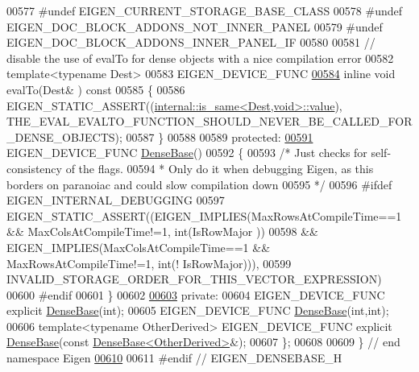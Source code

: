 \begin{DoxyCode}
00577 \textcolor{preprocessor}{#undef EIGEN\_CURRENT\_STORAGE\_BASE\_CLASS}
00578 \textcolor{preprocessor}{#undef EIGEN\_DOC\_BLOCK\_ADDONS\_NOT\_INNER\_PANEL}
00579 \textcolor{preprocessor}{#undef EIGEN\_DOC\_BLOCK\_ADDONS\_INNER\_PANEL\_IF}
00580 
00581     \textcolor{comment}{// disable the use of evalTo for dense objects with a nice compilation error}
00582     \textcolor{keyword}{template}<\textcolor{keyword}{typename} Dest>
00583     EIGEN\_DEVICE\_FUNC
\hyperlink{group___core___module_ad770bd93a55f1b4a561a00dbda6207d7}{00584}     \textcolor{keyword}{inline} \textcolor{keywordtype}{void} evalTo(Dest& )\textcolor{keyword}{ const}
00585 \textcolor{keyword}{    }\{
00586       EIGEN\_STATIC\_ASSERT((\hyperlink{struct_eigen_1_1internal_1_1is__same}{internal::is\_same<Dest,void>::value}),
      THE\_EVAL\_EVALTO\_FUNCTION\_SHOULD\_NEVER\_BE\_CALLED\_FOR\_DENSE\_OBJECTS);
00587     \}
00588 
00589   \textcolor{keyword}{protected}:
\hyperlink{group___core___module_ae966dfaa11cfd07e87da040b7a9d8216}{00591}     EIGEN\_DEVICE\_FUNC \hyperlink{group___core___module_ae966dfaa11cfd07e87da040b7a9d8216}{DenseBase}()
00592     \{
00593       \textcolor{comment}{/* Just checks for self-consistency of the flags.}
00594 \textcolor{comment}{       * Only do it when debugging Eigen, as this borders on paranoiac and could slow compilation down}
00595 \textcolor{comment}{       */}
00596 \textcolor{preprocessor}{#ifdef EIGEN\_INTERNAL\_DEBUGGING}
00597       EIGEN\_STATIC\_ASSERT((EIGEN\_IMPLIES(MaxRowsAtCompileTime==1 && MaxColsAtCompileTime!=1, \textcolor{keywordtype}{int}(IsRowMajor
      ))
00598                         && EIGEN\_IMPLIES(MaxColsAtCompileTime==1 && MaxRowsAtCompileTime!=1, \textcolor{keywordtype}{int}(!
      IsRowMajor))),
00599                           INVALID\_STORAGE\_ORDER\_FOR\_THIS\_VECTOR\_EXPRESSION)
00600 \textcolor{preprocessor}{#endif}
00601     \}
00602 
\hyperlink{group___core___module_a51dba0f45bdf7eef96043b318380054a}{00603}   \textcolor{keyword}{private}:
00604     EIGEN\_DEVICE\_FUNC \textcolor{keyword}{explicit} \hyperlink{group___core___module_class_eigen_1_1_dense_base}{DenseBase}(\textcolor{keywordtype}{int});
00605     EIGEN\_DEVICE\_FUNC \hyperlink{group___core___module_class_eigen_1_1_dense_base}{DenseBase}(\textcolor{keywordtype}{int},\textcolor{keywordtype}{int});
00606     \textcolor{keyword}{template}<\textcolor{keyword}{typename} OtherDerived> EIGEN\_DEVICE\_FUNC \textcolor{keyword}{explicit} \hyperlink{group___core___module_class_eigen_1_1_dense_base}{DenseBase}(\textcolor{keyword}{const} 
      \hyperlink{group___core___module_class_eigen_1_1_dense_base}{DenseBase<OtherDerived>}&);
00607 \};
00608 
00609 \} \textcolor{comment}{// end namespace Eigen}
\hyperlink{group___core___module_a06af178e6158c789e79987a60d4ae3b7}{00610} 
00611 \textcolor{preprocessor}{#endif // EIGEN\_DENSEBASE\_H}
\end{DoxyCode}
